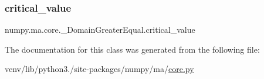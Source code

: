 \subsubsection{\texorpdfstring{critical\+\_\+value}{critical\_value}}
{\footnotesize\ttfamily numpy.\+ma.\+core.\+\_\+\+Domain\+Greater\+Equal.\+critical\+\_\+value}



The documentation for this class was generated from the following file\+:\begin{DoxyCompactItemize}
\item 
venv/lib/python3./site-\/packages/numpy/ma/\hyperlink{numpy_2ma_2core_8py}{core.\+py}\end{DoxyCompactItemize}
